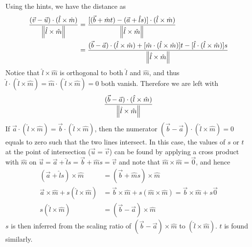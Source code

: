 \begin{Answer}
Using the hints, we have the distance as
\begin{align*}
\frac{(\vec{v} - \vec{u}) \cdot (\hat{l} \times \hat{m})}{\norm{\hat{l} \times \hat{m}}} &= \frac{[(\vec{b} + \hat{m}t) - (\vec{a} + \hat{l}s)] \cdot (\hat{l} \times \hat{m})}{\norm{\hat{l} \times \hat{m}}} \\
&= \frac{(\vec{b} - \vec{a}) \cdot (\hat{l} \times \hat{m}) + [\hat{m} \cdot (\hat{l} \times \hat{m})] t - [\hat{l} \cdot (\hat{l} \times \hat{m})] s}{\norm{\hat{l} \times \hat{m}}}
\end{align*}
Notice that $\hat{l} \times \hat{m}$ is orthogonal to both $\hat{l}$ and $\hat{m}$, and thus $\hat{l} \cdot (\hat{l} \times \hat{m}) = \hat{m} \cdot (\hat{l} \times \hat{m}) = 0$ both vanish. Therefore we are left with
\begin{align*}
\frac{(\vec{b} - \vec{a}) \cdot (\hat{l} \times \hat{m})}{\norm{\hat{l} \times \hat{m}}} 
\end{align*} 
If $\vec{a} \cdot (\hat{l} \times \hat{m}) = \vec{b} \cdot (\hat{l} \times \hat{m})$, then the numerator $(\vec{b} - \vec{a}) \cdot (\hat{l} \times \hat{m}) = 0$ equals to zero such that the two lines intersect. In this case, the values of $s$ or $t$ at the point of intersection ($\vec{u} = \vec{v}$) can be found by applying a cross product with $\hat{m}$ on $\vec{u} = \vec{a} + \hat{l}s = \vec{b} + \hat{m}s = \vec{v}$ and note that $\hat{m} \times \hat{m} = \vec{0}$, and hence
\begin{align*}
(\vec{a} + \hat{l}s) \times \hat{m} &= (\vec{b} + \hat{m}s) \times \hat{m} \\
\vec{a} \times \hat{m} + s(\hat{l} \times \hat{m}) &= \vec{b} \times \hat{m} + s (\hat{m} \times \hat{m}) =  \vec{b} \times \hat{m} + s\vec{0}\\
s (\hat{l} \times \hat{m}) &= (\vec{b} - \vec{a}) \times \hat{m}
\end{align*}
$s$ is then inferred from the scaling ratio of $(\vec{b} - \vec{a}) \times \hat{m}$ to $(\hat{l} \times \hat{m})$. $t$ is found similarly.
\end{Answer}

